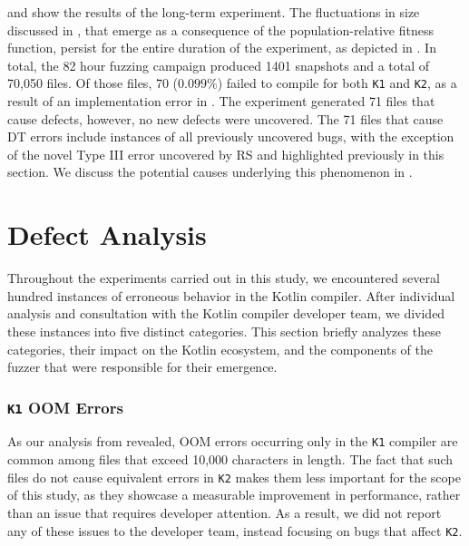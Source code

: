  and  show the results of the long-term experiment.
The fluctuations in size discussed in , that emerge
as a consequence of the population-relative fitness function,
persist for the entire duration of the experiment, as depicted in .
In total, the 82 hour fuzzing campaign produced 1401 snapshots and a total of 70,050 files.
Of those files, 70 ($0.099\%$) failed to compile for both \texttt{K1} and \texttt{K2},
as a result of an implementation error in \kf.
The experiment generated 71 files that cause defects, however, no new defects were uncovered.
The 71 files that cause \gls{DT} errors include instances of all previously
uncovered bugs, with the exception of the novel Type III error uncovered by \gls{RS}
and highlighted previously in this section.
We discuss the potential causes underlying this phenomenon in .

\begin{center}
\end{center}

\section{\label{sec:buganalysis}Defect Analysis}

Throughout the experiments carried out in this study, we encountered
several hundred instances of erroneous behavior in the Kotlin compiler.
After individual analysis and consultation with the Kotlin compiler
developer team, we divided these instances into five distinct categories.
This section briefly analyzes these categories, their impact on the Kotlin ecosystem,
and the components of the fuzzer that were responsible for their emergence.

\subsubsection{\texttt{K1} \gls{OOM} Errors}

As our analysis from  revealed, \gls{OOM} errors
occurring only in the \texttt{K1} compiler are common among files that exceed
10,000 characters in length.
The fact that such files do not cause equivalent errors in \texttt{K2}
makes them less important for the scope of this study, as they showcase a measurable
improvement in performance, rather than an issue that requires developer attention.
As a result, we did not report any of these issues to the developer team,
instead focusing on bugs that affect \texttt{K2}.

